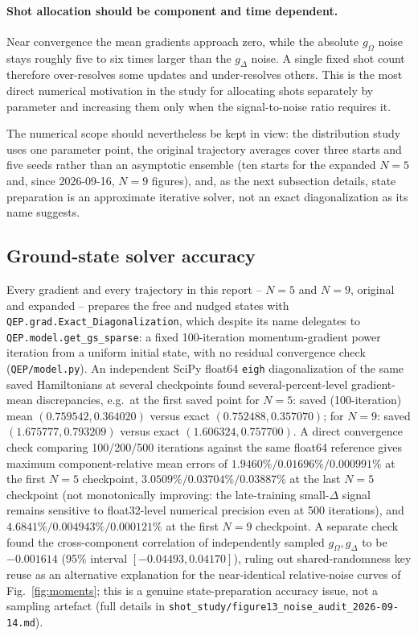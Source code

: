 \documentclass[11pt]{article}
\begin{document}
\paragraph{Shot allocation should be component and time dependent.}
Near convergence the mean gradients approach zero, while the absolute $g_\Omega$ noise
stays roughly five to six times larger than the $g_\Delta$ noise.  A single fixed shot
count therefore over-resolves some updates and under-resolves others.  This is the most
direct numerical motivation in the study for allocating shots separately by parameter
and increasing them only when the signal-to-noise ratio requires it.

The numerical scope should nevertheless be kept in view: the distribution study uses
one parameter point, the original trajectory averages cover three starts and five
seeds rather than an asymptotic ensemble (ten starts for the expanded $N=5$ and,
since 2026-09-16, $N=9$ figures), and, as the next subsection details, state
preparation is an approximate iterative solver, not an exact diagonalization as its
name suggests.

\subsection{Ground-state solver accuracy}
\label{sec:solver-accuracy}

Every gradient and every trajectory in this report -- $N=5$ and $N=9$, original and
expanded -- prepares the free and nudged states with \texttt{QEP.grad.Exact\_Diagonalization},
which despite its name delegates to \texttt{QEP.model.get\_gs\_sparse}: a fixed
100-iteration momentum-gradient power iteration from a uniform initial state, with no
residual convergence check (\texttt{QEP/model.py}).  An independent SciPy float64
\texttt{eigh} diagonalization of the same saved Hamiltonians at several checkpoints
found several-percent-level gradient-mean discrepancies, e.g.\ at the first saved
point for $N=5$: saved (100-iteration) mean $(0.759542,0.364020)$ versus exact
$(0.752488,0.357070)$; for $N=9$: saved $(1.675777,0.793209)$ versus exact
$(1.606324,0.757700)$.  A direct convergence check comparing 100/200/500 iterations
against the same float64 reference gives maximum component-relative mean errors of
$1.9460\%/0.01696\%/0.000991\%$ at the first $N=5$ checkpoint,
$3.0509\%/0.03704\%/0.03887\%$ at the last $N=5$ checkpoint (not monotonically
improving: the late-training small-$\Delta$ signal remains sensitive to float32-level
numerical precision even at 500 iterations), and $4.6841\%/0.004943\%/0.000121\%$ at
the first $N=9$ checkpoint.  A separate check found the cross-component correlation
of independently sampled $g_\Omega,g_\Delta$ to be $-0.001614$ (95\% interval
$[-0.04493,0.04170]$), ruling out shared-randomness key reuse as an alternative
explanation for the near-identical relative-noise curves of Fig.~\ref{fig:moments};
this is a genuine state-preparation accuracy issue, not a sampling artefact (full
details in \texttt{shot\_study/figure13\_noise\_audit\_2026-09-14.md}).
\end{document}

